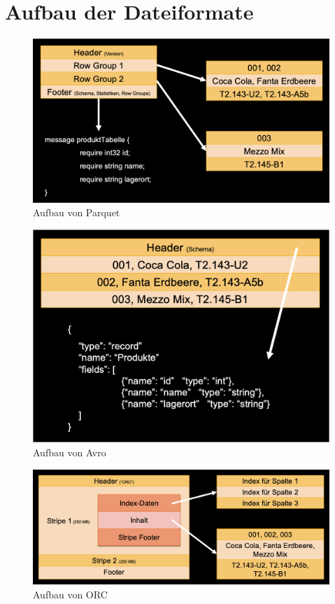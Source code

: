 \chapter{Aufbau der Dateiformate}
\begin{figure}[ht]
	\centering
	\includegraphics[width=1\textwidth]{Bilder/Parquet.png} 
	\caption{Aufbau von Parquet}
	\label{fig:Parquet}
\end{figure}
\clearpage
\begin{figure}[ht]
	\centering
	\includegraphics[width=1\textwidth]{Bilder/Avro.png} 
	\caption{Aufbau von Avro}
	\label{fig:Avro}
\end{figure}
\clearpage
\begin{figure}[ht]
	\centering
	\includegraphics[width=1\textwidth]{Bilder/ORC.png} 
	\caption{Aufbau von ORC}
	\label{fig:ORC}
\end{figure}
\clearpage

